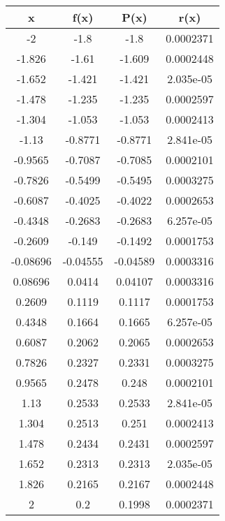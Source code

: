 \documentclass{article}
\begin{document}
\begin{center}\begin{tabular}{|c|c|c|c|}
\hline
x &f(x) &P(x) &r(x)\\\hline 
-2 &-1.8 &-1.8 &0.0002371 \\\hline 
-1.826 &-1.61 &-1.609 &0.0002448 \\\hline 
-1.652 &-1.421 &-1.421 &2.035e-05 \\\hline 
-1.478 &-1.235 &-1.235 &0.0002597 \\\hline 
-1.304 &-1.053 &-1.053 &0.0002413 \\\hline 
-1.13 &-0.8771 &-0.8771 &2.841e-05 \\\hline 
-0.9565 &-0.7087 &-0.7085 &0.0002101 \\\hline 
-0.7826 &-0.5499 &-0.5495 &0.0003275 \\\hline 
-0.6087 &-0.4025 &-0.4022 &0.0002653 \\\hline 
-0.4348 &-0.2683 &-0.2683 &6.257e-05 \\\hline 
-0.2609 &-0.149 &-0.1492 &0.0001753 \\\hline 
-0.08696 &-0.04555 &-0.04589 &0.0003316 \\\hline 
0.08696 &0.0414 &0.04107 &0.0003316 \\\hline 
0.2609 &0.1119 &0.1117 &0.0001753 \\\hline 
0.4348 &0.1664 &0.1665 &6.257e-05 \\\hline 
0.6087 &0.2062 &0.2065 &0.0002653 \\\hline 
0.7826 &0.2327 &0.2331 &0.0003275 \\\hline 
0.9565 &0.2478 &0.248 &0.0002101 \\\hline 
1.13 &0.2533 &0.2533 &2.841e-05 \\\hline 
1.304 &0.2513 &0.251 &0.0002413 \\\hline 
1.478 &0.2434 &0.2431 &0.0002597 \\\hline 
1.652 &0.2313 &0.2313 &2.035e-05 \\\hline 
1.826 &0.2165 &0.2167 &0.0002448 \\\hline 
2 &0.2 &0.1998 &0.0002371 \\\hline 
\end{tabular}
\end{center}
\end{document}
